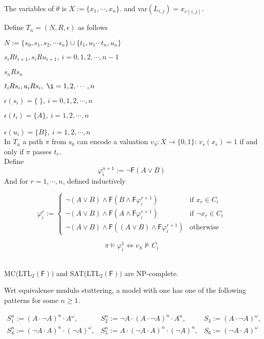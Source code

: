 \documentclass[12pt]{article}
\begin{document}
The variables of $\theta$ is $X:=\{x_1,\cdots, x_n\}$. and var$(L_{i,j})=x_{r(i,j)}$.

Define $T_n=(N,R,\epsilon)$ as follows

$N:=\{s_0, s_1,s_2,\cdots s_n\}\cup\{t_1, u_1\cdots t_n, u_n\}$

$s_iR t_{i+1}, s_iRu_{i+1}, \ i=0,1,2,\cdots,n-1$

$s_n R s_n$

$t_iR s_{i}, u_{i}R s_{i}, \ \i=1,2,\cdots,n$


$\epsilon(s_i)=\{ \ \}, \ i=0,1,2,\cdots,n$

$\epsilon(t_i)=\{A\},\ i=1,2,\cdots,n$

$\epsilon(u_i)=\{B\}, \ i=1,2,\cdots,n$
\ \\

In $T_n$ a path $\pi$ from $s_0$ can encode a valuation $v_S:X\rightarrow\{0,1\}$: $v_s(x_r)=1$ if and only if $\pi$ passes $t_r$. \\

Define $$\varphi_i^{n+1}:=\neg \textsf{F}(A\vee B)$$
And for $r=1,\cdots,n$, defined inductively

$$\varphi^r_i:=\left\{
\begin{array}{ll}
\neg(A\vee B)\wedge \textsf{F}(B\wedge\textsf{F}\varphi_i^{r+1}) & \mbox{if }x_r\in C_i\\
\neg(A\vee B)\wedge \textsf{F}(A\wedge\textsf{F}\varphi_i^{r+1}) & \mbox{if }\neg x_r\in C_i\\
\neg(A\vee B)\wedge \textsf{F}((A\vee B)\wedge\textsf{F}\varphi_i^{r+1}) & \mbox{otherwise}
\end{array}\right.
$$

$$\pi\models\varphi^1_i\Longleftrightarrow v_S\not\models C_i$$

\ \\

MC(LTL$_2(\textsf{F}))$ and SAT(LTL$_2(\textsf{F}))$ are NP-complete.



Wrt equivalence mudulo stuttering, a model with one has one of the following patterns for some $n\geq 1$.

$$\begin{array}{lll}
S^n_1:=(A\cdot \neg A)^n\cdot A^{\omega}, & S^n_2:=\neg A\cdot (A\cdot\neg A)^n\cdot A^n, & S_3:=(A\cdot\neg A)^\omega,\\

S^n_4:=(\neg A\cdot A)^n\cdot (\neg A)^{\omega}, & S^n_5:=A\cdot (\neg A\cdot A)^n\cdot (\neg A)^n, & S_6:=(\neg A\cdot A)^\omega
\end{array}
$$
\end{document}
